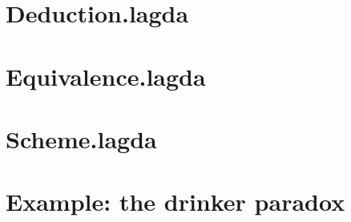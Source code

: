 \documentclass{article}
\begin{document}
\section{Deduction.lagda}


\section{Equivalence.lagda}


\section{Scheme.lagda}


\section{Example: the drinker paradox}


{}

\end{document}
